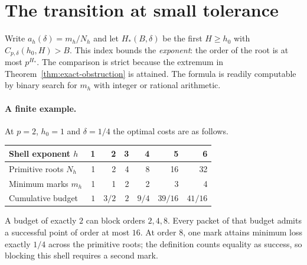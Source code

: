 \section{The transition at small tolerance}\label{sec:limit}
Write $a_h(\delta)=m_h/N_h$ and let $H_*(B,\delta)$ be the first $H\ge h_0$ with $C_{p,\delta}(h_0,H)>B$. This index bounds the \emph{exponent}: the order of the root is at most $p^{H_*}$. The comparison is strict because the extremum in Theorem~\ref{thm:exact-obstruction} is attained. The formula is readily computable by binary search for $m_h$ with integer or rational arithmetic.

\paragraph{A finite example.}
At $p=2$, $h_0=1$ and $\delta=1/4$ the optimal costs are as follows.
\begin{center}\begin{tabular}{@{}lrrrrrr@{}}\toprule
Shell exponent $h$ & 1 & 2 & 3 & 4 & 5 & 6\\
\midrule
Primitive roots $N_h$ & 1&2&4&8&16&32\\
Minimum marks $m_h$ &1&1&2&2&3&4\\
Cumulative budget & $1$ & $3/2$ & $2$ & $9/4$ & $39/16$ & $41/16$\\
\bottomrule\end{tabular}\end{center}
A budget of exactly $2$ can block orders $2,4,8$. Every packet of that budget admits a successful point of order at most $16$. At order $8$, one mark attains minimum loss exactly $1/4$ across the primitive roots; the definition counts equality as success, so blocking this shell requires a second mark.

